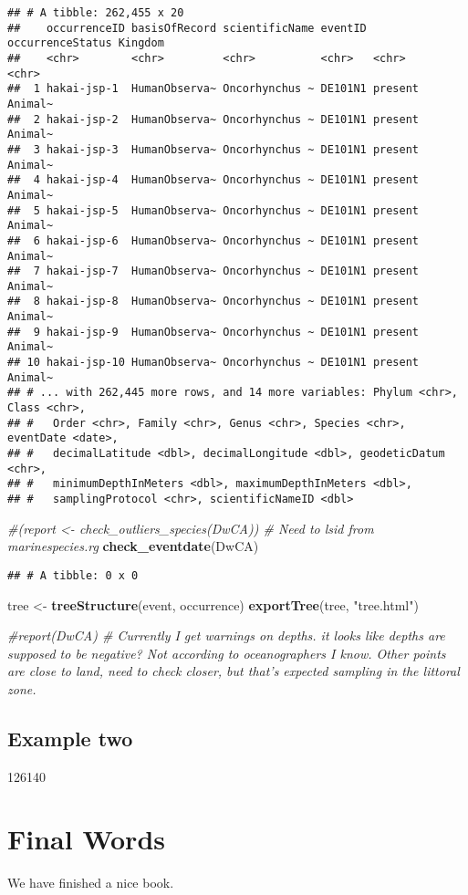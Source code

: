 \documentclass[]{book}
\newenvironment{Shaded}{\begin{snugshade}}{\end{snugshade}}
\newcommand{\CommentTok}[1]{\textcolor[rgb]{0.56,0.35,0.01}{\textit{#1}}}
\newcommand{\KeywordTok}[1]{\textcolor[rgb]{0.13,0.29,0.53}{\textbf{#1}}}
\newcommand{\NormalTok}[1]{#1}
\newcommand{\StringTok}[1]{\textcolor[rgb]{0.31,0.60,0.02}{#1}}
\begin{document}
\begin{verbatim}
## # A tibble: 262,455 x 20
##    occurrenceID basisOfRecord scientificName eventID occurrenceStatus Kingdom
##    <chr>        <chr>         <chr>          <chr>   <chr>            <chr>  
##  1 hakai-jsp-1  HumanObserva~ Oncorhynchus ~ DE101N1 present          Animal~
##  2 hakai-jsp-2  HumanObserva~ Oncorhynchus ~ DE101N1 present          Animal~
##  3 hakai-jsp-3  HumanObserva~ Oncorhynchus ~ DE101N1 present          Animal~
##  4 hakai-jsp-4  HumanObserva~ Oncorhynchus ~ DE101N1 present          Animal~
##  5 hakai-jsp-5  HumanObserva~ Oncorhynchus ~ DE101N1 present          Animal~
##  6 hakai-jsp-6  HumanObserva~ Oncorhynchus ~ DE101N1 present          Animal~
##  7 hakai-jsp-7  HumanObserva~ Oncorhynchus ~ DE101N1 present          Animal~
##  8 hakai-jsp-8  HumanObserva~ Oncorhynchus ~ DE101N1 present          Animal~
##  9 hakai-jsp-9  HumanObserva~ Oncorhynchus ~ DE101N1 present          Animal~
## 10 hakai-jsp-10 HumanObserva~ Oncorhynchus ~ DE101N1 present          Animal~
## # ... with 262,445 more rows, and 14 more variables: Phylum <chr>, Class <chr>,
## #   Order <chr>, Family <chr>, Genus <chr>, Species <chr>, eventDate <date>,
## #   decimalLatitude <dbl>, decimalLongitude <dbl>, geodeticDatum <chr>,
## #   minimumDepthInMeters <dbl>, maximumDepthInMeters <dbl>,
## #   samplingProtocol <chr>, scientificNameID <dbl>
\end{verbatim}

\begin{Shaded}
\begin{Highlighting}[]
\CommentTok{#(report <- check_outliers_species(DwCA)) # Need to lsid from marinespecies.rg}
\KeywordTok{check_eventdate}\NormalTok{(DwCA)}
\end{Highlighting}
\end{Shaded}

\begin{verbatim}
## # A tibble: 0 x 0
\end{verbatim}

\begin{Shaded}
\begin{Highlighting}[]
\NormalTok{tree <-}\StringTok{ }\KeywordTok{treeStructure}\NormalTok{(event, occurrence)}
\KeywordTok{exportTree}\NormalTok{(tree, }\StringTok{"tree.html"}\NormalTok{)}

\CommentTok{#report(DwCA) # Currently I get warnings on depths. it looks like depths are supposed to be negative? Not according to oceanographers I know. Other points are close to land, need to check closer, but that's expected sampling in the littoral zone.}
\end{Highlighting}
\end{Shaded}

\hypertarget{example-two}{%
\section{Example two}\label{example-two}}

126140

\hypertarget{final-words}{%
\chapter{Final Words}\label{final-words}}

We have finished a nice book.


\end{document}
